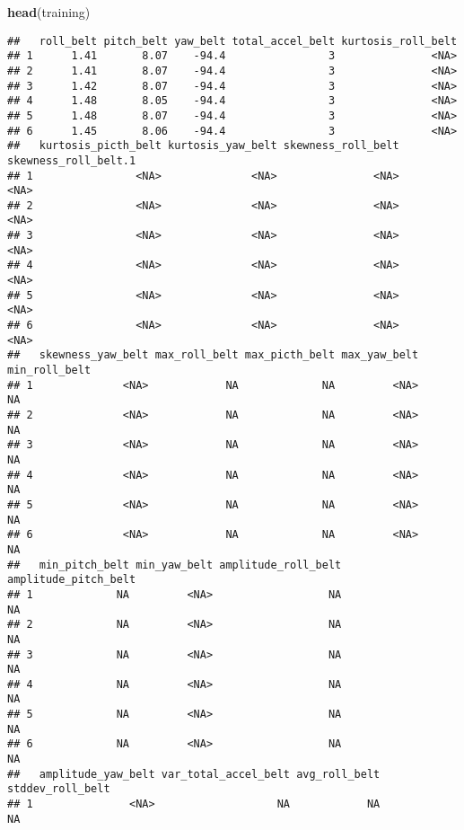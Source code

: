 \documentclass[
]{article}
\newenvironment{Shaded}{\begin{snugshade}}{\end{snugshade}}
\newcommand{\KeywordTok}[1]{\textcolor[rgb]{0.13,0.29,0.53}{\textbf{#1}}}
\newcommand{\NormalTok}[1]{#1}
\begin{document}
\begin{Shaded}
\begin{Highlighting}[]
\KeywordTok{head}\NormalTok{(training)}
\end{Highlighting}
\end{Shaded}

\begin{verbatim}
##   roll_belt pitch_belt yaw_belt total_accel_belt kurtosis_roll_belt
## 1      1.41       8.07    -94.4                3               <NA>
## 2      1.41       8.07    -94.4                3               <NA>
## 3      1.42       8.07    -94.4                3               <NA>
## 4      1.48       8.05    -94.4                3               <NA>
## 5      1.48       8.07    -94.4                3               <NA>
## 6      1.45       8.06    -94.4                3               <NA>
##   kurtosis_picth_belt kurtosis_yaw_belt skewness_roll_belt skewness_roll_belt.1
## 1                <NA>              <NA>               <NA>                 <NA>
## 2                <NA>              <NA>               <NA>                 <NA>
## 3                <NA>              <NA>               <NA>                 <NA>
## 4                <NA>              <NA>               <NA>                 <NA>
## 5                <NA>              <NA>               <NA>                 <NA>
## 6                <NA>              <NA>               <NA>                 <NA>
##   skewness_yaw_belt max_roll_belt max_picth_belt max_yaw_belt min_roll_belt
## 1              <NA>            NA             NA         <NA>            NA
## 2              <NA>            NA             NA         <NA>            NA
## 3              <NA>            NA             NA         <NA>            NA
## 4              <NA>            NA             NA         <NA>            NA
## 5              <NA>            NA             NA         <NA>            NA
## 6              <NA>            NA             NA         <NA>            NA
##   min_pitch_belt min_yaw_belt amplitude_roll_belt amplitude_pitch_belt
## 1             NA         <NA>                  NA                   NA
## 2             NA         <NA>                  NA                   NA
## 3             NA         <NA>                  NA                   NA
## 4             NA         <NA>                  NA                   NA
## 5             NA         <NA>                  NA                   NA
## 6             NA         <NA>                  NA                   NA
##   amplitude_yaw_belt var_total_accel_belt avg_roll_belt stddev_roll_belt
## 1               <NA>                   NA            NA               NA

\end{verbatim}
\end{document}
